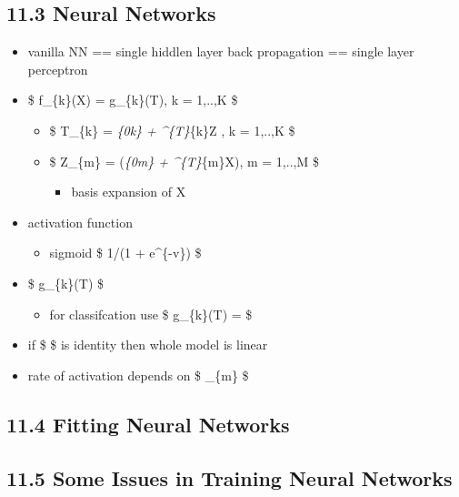 \documentclass[11pt]{article}
\providecommand{\tightlist}{%
      \setlength{\itemsep}{0pt}\setlength{\parskip}{0pt}}
\begin{document}
\subsection{11.3 Neural Networks}\label{neural-networks-1}

\begin{itemize}
\tightlist
\item
  vanilla NN == single hiddlen layer back propagation == single layer
  perceptron
\item
  \$ f\_\{k\}(X) = g\_\{k\}(T), k = 1,..,K \$

  \begin{itemize}
  \tightlist
  \item
    \$ T\_\{k\} = \beta\emph{\{0k\} + \beta\^{}\{T\}}\{k\}Z , k = 1,..,K
    \$
  \item
    \$ Z\_\{m\} = \sigma(\alpha\emph{\{0m\} + \alpha\^{}\{T\}}\{m\}X), m
    = 1,..,M \$

    \begin{itemize}
    \tightlist
    \item
      basis expansion of X
    \end{itemize}
  \end{itemize}
\item
  activation function

  \begin{itemize}
  \tightlist
  \item
    sigmoid \$ 1/(1 + e\^{}\{-v\}) \$
  \end{itemize}
\item
  \$ g\_\{k\}(T) \$

  \begin{itemize}
  \tightlist
  \item
    for classifcation use \$ g\_\{k\}(T) =
     \$
  \end{itemize}
\item
  if \$ \sigma \$ is identity then whole model is linear
\item
  rate of activation depends on \$ \textbar{} \alpha\_\{m\} \textbar{}
  \$
\end{itemize}

\subsection{11.4 Fitting Neural Networks}\label{fitting-neural-networks}

\subsection{11.5 Some Issues in Training Neural
Networks}\label{some-issues-in-training-neural-networks}
\end{document}
